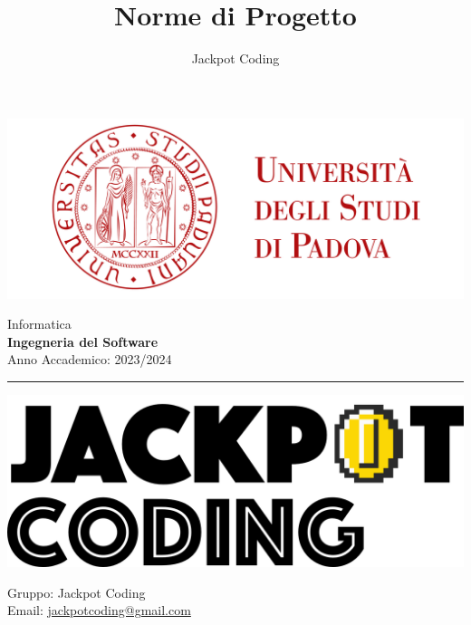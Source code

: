 \documentclass[5pt]{article}
\title{Norme di Progetto}
\author{Jackpot Coding}
\begin{document}

\vspace{8pt}
\includegraphics[scale=0.2]{assets/UNIPDFull.png}

\vspace{30pt}

\begin{minipage}[t]{0.48\textwidth}
	\begin{flushleft}
		Informatica\\
		\vspace{5pt}
		\textbf{\LARGE Ingegneria del Software}\\
		Anno Accademico: 2023/2024
	\end{flushleft}
\end{minipage}


\vspace{5px}


\textcolor{black}{\rule{\textwidth}{5pt}}

\begin{minipage}[t]{0.50\textwidth}
	\begin{flushleft}
		\hspace{10pt}
		\includegraphics[scale=0.65]{assets/jackpot-logo.png} 
	\end{flushleft}
\end{minipage}
\hspace{-60pt} %
\begin{flushright}
	\begin{minipage}[t]{0.50\textwidth}
		\begin{flushright}
			Gruppo: {\Large Jackpot Coding}\\
			Email: \href{mailto:jackpotcoding@gmail.com}{jackpotcoding@gmail.com}
		\end{flushright}
	\end{minipage}
\end{flushright}
\end{document}
